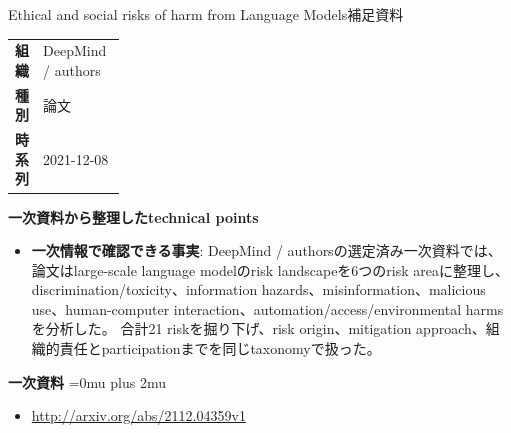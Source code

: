 \begin{technicalnote}{Ethical and social risks of harm from Language Models}{補足資料}
\begingroup
\begin{tabularx}{\linewidth}{@{}>{\bfseries}p{0.22\linewidth}X@{}}
組織 & DeepMind / authors \\
種別 & 論文 \\
時系列 & 2021-12-08 \\
\end{tabularx}
\smallskip
{\bfseries 一次資料から整理したtechnical points}
\begin{itemize}[leftmargin=1.5em,itemsep=0.35em]
\item \textbf{一次情報で確認できる事実}: DeepMind / authorsの選定済み一次資料では、論文はlarge-scale language modelのrisk landscapeを6つのrisk areaに整理し、discrimination/toxicity、information hazards、misinformation、malicious use、human-computer interaction、automation/access/environmental harmsを分析した。 合計21 riskを掘り下げ、risk origin、mitigation approach、組織的責任とparticipationまでを同じtaxonomyで扱った。
\end{itemize}
\begin{minipage}{\linewidth}
\begin{samepage}
{\bfseries 一次資料}
\begingroup\sloppy
\Urlmuskip=0mu plus 2mu\relax
\begin{itemize}[leftmargin=1.5em,itemsep=0.25em]
\item {\scriptsize\url{http://arxiv.org/abs/2112.04359v1}}
\end{itemize}
\endgroup
\end{samepage}
\end{minipage}
\endgroup
\end{technicalnote}
\medskip
